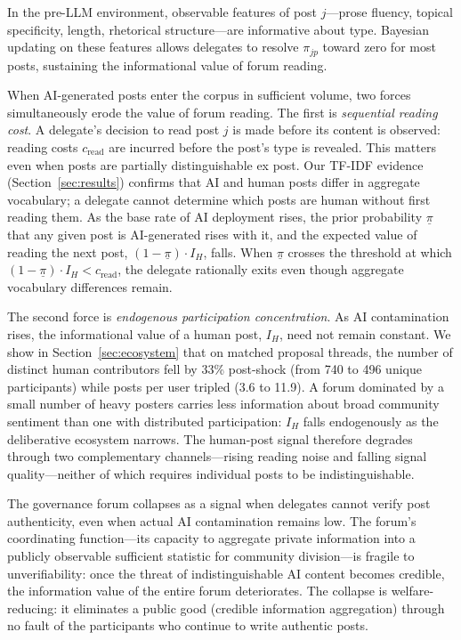 \documentclass[12pt]{article}
\begin{document}
In the pre-LLM environment, observable features of post $j$---prose fluency,
topical specificity, length, rhetorical structure---are informative about type.
Bayesian updating on these features allows delegates to resolve $\pi_{jp}$ toward
zero for most posts, sustaining the informational value of forum reading.

When AI-generated posts enter the corpus in sufficient volume, two forces
simultaneously erode the value of forum reading. The first is \emph{sequential
reading cost}. A delegate's decision to read post $j$ is made before its content
is observed: reading costs $c_{\text{read}}$ are incurred before the post's type
is revealed. This matters even when posts are partially distinguishable ex post.
Our TF-IDF evidence (Section~\ref{sec:results}) confirms that AI and human posts
differ in aggregate vocabulary; a delegate cannot determine which posts are
human without first reading them. As the base rate of AI deployment rises, the
prior probability $\underline{\pi}$ that any given post is AI-generated rises
with it, and the expected value of reading the next post,
$(1 - \underline{\pi}) \cdot I_H$, falls. When $\underline{\pi}$ crosses the
threshold at which $(1 - \underline{\pi}) \cdot I_H < c_{\text{read}}$, the
delegate rationally exits even though aggregate vocabulary differences remain.

The second force is \emph{endogenous participation concentration}. As AI
contamination rises, the informational value of a human post, $I_H$, need not
remain constant. We show in Section~\ref{sec:ecosystem} that on matched proposal
threads, the number of distinct human contributors fell by 33\% post-shock (from
740 to 496 unique participants) while posts per user tripled (3.6 to 11.9). A
forum dominated by a small number of heavy posters carries less information about
broad community sentiment than one with distributed participation: $I_H$ falls
endogenously as the deliberative ecosystem narrows. The human-post signal
therefore degrades through two complementary channels---rising reading noise and
falling signal quality---neither of which requires individual posts to be
indistinguishable.

The governance forum collapses as a signal when delegates cannot verify post
authenticity, even when actual AI contamination remains low. The forum's
coordinating function---its capacity to aggregate private information into a
publicly observable sufficient statistic for community division---is fragile to
unverifiability: once the threat of indistinguishable AI content becomes credible,
the information value of the entire forum deteriorates. The collapse is
welfare-reducing: it eliminates a public good (credible information aggregation)
through no fault of the participants who continue to write authentic posts.
\end{document}
